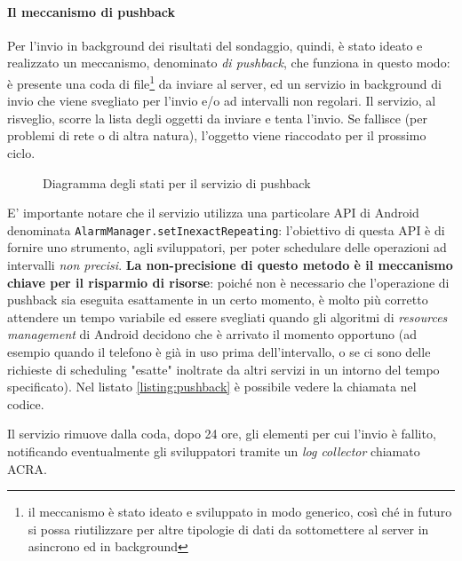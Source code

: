 \documentclass[a4paper,10pt]{memoir}
\begin{document}
\paragraph{Il meccanismo di pushback} Per l'invio in background dei risultati del sondaggio, quindi, è stato ideato e realizzato un meccanismo, denominato \textit{di pushback}, che funziona in questo modo: è presente una coda di file\footnote{il meccanismo è stato ideato e sviluppato in modo generico, così ché in futuro si possa riutilizzare per altre tipologie di dati da sottomettere al server in asincrono ed in background} da inviare al server, ed un servizio in background di invio che viene svegliato per l'invio e/o ad intervalli non regolari. Il servizio, al risveglio, scorre la lista degli oggetti da inviare e tenta l'invio. Se fallisce (per problemi di rete o di altra natura), l'oggetto viene riaccodato per il prossimo ciclo.

\begin{figure}[ht]
\centering
\caption{Diagramma degli stati per il servizio di pushback}
\label{fig:scs_pb1}
\end{figure}

E' importante notare che il servizio utilizza una particolare API di Android denominata \texttt{AlarmManager.setInexactRepeating}: l'obiettivo di questa API è di fornire uno strumento, agli sviluppatori, per poter schedulare delle operazioni ad intervalli \textit{non precisi}. \textbf{La non-precisione di questo metodo è il meccanismo chiave per il risparmio di risorse}: poiché non è necessario che l'operazione di pushback sia eseguita esattamente in un certo momento, è molto più corretto attendere un tempo variabile ed essere svegliati quando gli algoritmi di \textit{resources management} di Android decidono che è arrivato il momento opportuno (ad esempio quando il telefono è già in uso prima dell'intervallo, o se ci sono delle richieste di scheduling "esatte" inoltrate da altri servizi in un intorno del tempo specificato). Nel listato \ref{listing:pushback} è possibile vedere la chiamata nel codice.

Il servizio rimuove dalla coda, dopo 24 ore, gli elementi per cui l'invio è fallito, notificando eventualmente gli sviluppatori tramite un \textit{log collector} chiamato ACRA.
\end{document}
